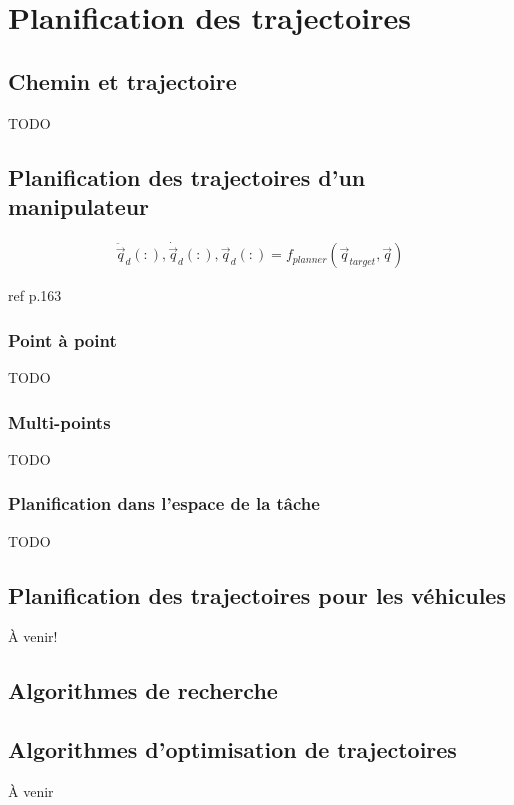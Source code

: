 \chapter{Planification des trajectoires}



\section{Chemin et trajectoire}
TODO

\section{Planification des trajectoires d'un manipulateur}

%
\begin{align}
  \ddot{\vec{q}}_d(:),\dot{\vec{q}}_d(:),\vec{q}_d(:) = f_{planner}(\vec{q}_{target}, \vec{q})
	\label{eq:trajgen}
\end{align}
%

ref p.163

\subsection{Point à point}
TODO

\subsection{Multi-points}
TODO



\subsection{Planification dans l'espace de la tâche}
TODO


\section{Planification des trajectoires pour les véhicules}

À venir!

\section{Algorithmes de recherche}


\section{Algorithmes d'optimisation de trajectoires}


À venir
